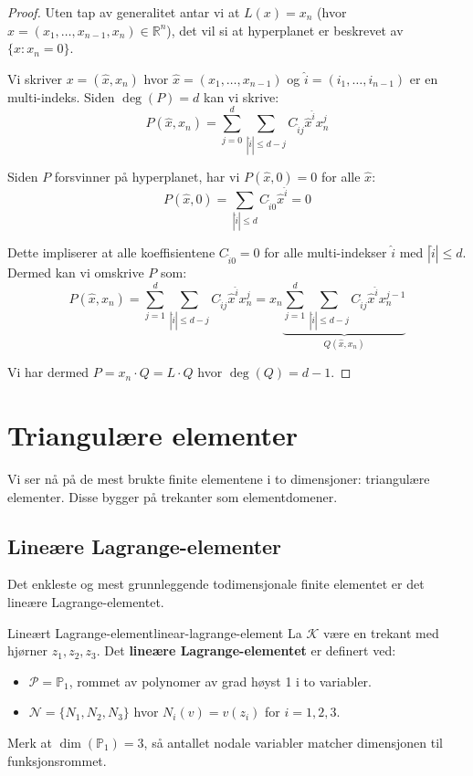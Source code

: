 \documentclass[../../main.tex]{subfiles}
\begin{document}
\begin{proof}
Uten tap av generalitet antar vi at $L(x) = x_n$ (hvor $x = (x_1, \ldots, x_{n-1}, x_n) \in \mathbb{R}^n$), det vil si at hyperplanet er beskrevet av $\{x : x_n = 0\}$.

Vi skriver $x = (\hat{x}, x_n)$ hvor $\hat{x} = (x_1, \ldots, x_{n-1})$ og $\hat{i} = (i_1, \ldots, i_{n-1})$ er en multi-indeks. Siden $\deg(P) = d$ kan vi skrive:
\[
    P(\hat{x}, x_n) = \sum_{j=0}^d \sum_{|\hat{i}| \leq d - j} C_{\hat{i}j} \hat{x}^{\hat{i}} x_n^j
\]

Siden $P$ forsvinner på hyperplanet, har vi $P(\hat{x}, 0) = 0$ for alle $\hat{x}$:
\[
    P(\hat{x}, 0) = \sum_{|\hat{i}| \leq d} C_{\hat{i}0} \hat{x}^{\hat{i}} = 0
\]

Dette impliserer at alle koeffisientene $C_{\hat{i}0} = 0$ for alle multi-indekser $\hat{i}$ med $|\hat{i}| \leq d$. Dermed kan vi omskrive $P$ som:
\[
    P(\hat{x}, x_n) = \sum_{j=1}^d \sum_{|\hat{i}| \leq d - j} C_{\hat{i}j} \hat{x}^{\hat{i}} x_n^j = x_n \underbrace{\sum_{j=1}^d \sum_{|\hat{i}| \leq d - j} C_{\hat{i}j} \hat{x}^{\hat{i}} x_n^{j-1}}_{Q(\hat{x}, x_n)}
\]

Vi har dermed $P = x_n \cdot Q = L \cdot Q$ hvor $\deg(Q) = d - 1$.
\end{proof}

\section{Triangulære elementer}

Vi ser nå på de mest brukte finite elementene i to dimensjoner: triangulære elementer. Disse bygger på trekanter som elementdomener.

\subsection{Lineære Lagrange-elementer}

Det enkleste og mest grunnleggende todimensjonale finite elementet er det lineære Lagrange-elementet.

\begin{definition}{Lineært Lagrange-element}{linear-lagrange-element}
La $\mathcal{K}$ være en trekant med hjørner $z_1, z_2, z_3$. Det \textbf{lineære Lagrange-elementet} er definert ved:
\begin{itemize}
    \item $\mathcal{P} = \mathbb{P}_1$, rommet av polynomer av grad høyst 1 i to variabler.
    \item $\mathcal{N} = \{N_1, N_2, N_3\}$ hvor $N_i(v) = v(z_i)$ for $i = 1, 2, 3$.
\end{itemize}
Merk at $\dim(\mathbb{P}_1) = 3$, så antallet nodale variabler matcher dimensjonen til funksjonsrommet.
\end{definition}
\end{document}
